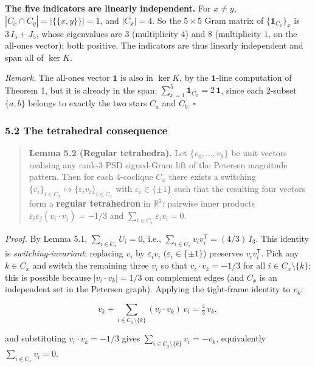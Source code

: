\documentclass[
]{article}
\begin{document}
\textbf{The five indicators are linearly independent.} For \(x \neq y\),
\(|C_x \cap C_y| = |\{\{x, y\}\}| = 1\), and \(|C_x| = 4\). So the
\(5\times 5\) Gram matrix of \(\{\mathbf{1}_{C_x}\}_x\) is
\(3\,I_5 + J_5\), whose eigenvalues are \(3\) (multiplicity \(4\)) and
\(8\) (multiplicity \(1\), on the all-ones vector); both positive. The
indicators are thus linearly independent and span all of \(\ker K\).

\emph{Remark.} The all-ones vector \(\mathbf{1}\) is also in \(\ker K\),
by the \(\mathbf{1}\)-line computation of Theorem 1, but it is already
in the span: \(\sum_{x=1}^{5} \mathbf{1}_{C_x} = 2\,\mathbf{1}\), since
each 2-subset \(\{a, b\}\) belongs to exactly the two stars \(C_a\) and
\(C_b\). \(\square\)

\subsubsection{5.2 The tetrahedral
consequence}\label{the-tetrahedral-consequence}

\begin{quote}
\textbf{Lemma 5.2 (Regular tetrahedra).} Let \(\{v_0,\ldots,v_9\}\) be
unit vectors realising any rank-\(3\) PSD signed-Gram lift of the
Petersen magnitude pattern. Then for each 4-coclique \(C_x\) there
exists a switching
\(\{v_i\}_{i\in C_x} \mapsto \{\varepsilon_i v_i\}_{i\in C_x}\) with
\(\varepsilon_i \in \{\pm 1\}\) such that the resulting four vectors
form a \textbf{regular tetrahedron} in \(\mathbb{R}^3\): pairwise inner
products \(\varepsilon_i\varepsilon_j (v_i \cdot v_j) = -1/3\) and
\(\sum_{i \in C_x} \varepsilon_i v_i = 0\).
\end{quote}

\emph{Proof.} By Lemma 5.1, \(\sum_{i \in C_x} U_i = 0\), i.e.,
\(\sum_{i \in C_x} v_i v_i^{\mathsf T} = (4/3)\,I_3\). This identity is
\emph{switching-invariant}: replacing \(v_i\) by \(\varepsilon_i v_i\)
(\(\varepsilon_i \in \{\pm 1\}\)) preserves \(v_i v_i^{\mathsf T}\).
Pick any \(k \in C_x\) and switch the remaining three \(v_i\) so that
\(v_i \cdot v_k = -1/3\) for all \(i \in C_x \setminus \{k\}\); this is
possible because \(|v_i \cdot v_k| = 1/3\) on complement edges (and
\(C_x\) is an independent set in the Petersen graph). Applying the
tight-frame identity to \(v_k\):

\[
v_k + \sum_{i \in C_x \setminus \{k\}} (v_i \cdot v_k)\, v_i
   = \tfrac{4}{3}\, v_k,
\]

and substituting \(v_i \cdot v_k = -1/3\) gives
\(\sum_{i \in C_x \setminus \{k\}} v_i = -v_k\), equivalently
\(\sum_{i \in C_x} v_i = 0\).
\end{document}
